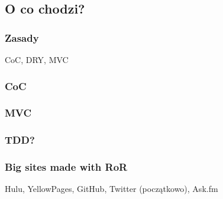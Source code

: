\subsection{O co chodzi?}
\begin{frame}[fragile]
\frametitle{Zasady}
CoC, DRY, MVC
\end{frame}

\begin{frame}[fragile]
\frametitle{CoC}
\end{frame}

\begin{frame}[fragile]
\frametitle{MVC}
\end{frame}

\begin{frame}[fragile]
\frametitle{TDD?}
\end{frame}

\begin{frame}[fragile]
\frametitle{Big sites made with RoR}
Hulu, YellowPages, GitHub, Twitter (początkowo), Ask.fm
\end{frame}
